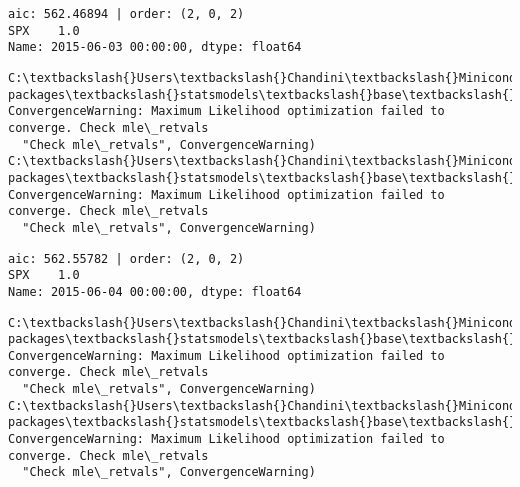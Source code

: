 \documentclass[11pt]{article}
\begin{document}
    \begin{Verbatim}[commandchars=\\\{\}]
aic: 562.46894 | order: (2, 0, 2)
SPX    1.0
Name: 2015-06-03 00:00:00, dtype: float64

    \end{Verbatim}

    \begin{Verbatim}[commandchars=\\\{\}]
C:\textbackslash{}Users\textbackslash{}Chandini\textbackslash{}Miniconda3\textbackslash{}envs\textbackslash{}auquan\textbackslash{}lib\textbackslash{}site-packages\textbackslash{}statsmodels\textbackslash{}base\textbackslash{}model.py:496: ConvergenceWarning: Maximum Likelihood optimization failed to converge. Check mle\_retvals
  "Check mle\_retvals", ConvergenceWarning)
C:\textbackslash{}Users\textbackslash{}Chandini\textbackslash{}Miniconda3\textbackslash{}envs\textbackslash{}auquan\textbackslash{}lib\textbackslash{}site-packages\textbackslash{}statsmodels\textbackslash{}base\textbackslash{}model.py:496: ConvergenceWarning: Maximum Likelihood optimization failed to converge. Check mle\_retvals
  "Check mle\_retvals", ConvergenceWarning)

    \end{Verbatim}

    \begin{Verbatim}[commandchars=\\\{\}]
aic: 562.55782 | order: (2, 0, 2)
SPX    1.0
Name: 2015-06-04 00:00:00, dtype: float64

    \end{Verbatim}

    \begin{Verbatim}[commandchars=\\\{\}]
C:\textbackslash{}Users\textbackslash{}Chandini\textbackslash{}Miniconda3\textbackslash{}envs\textbackslash{}auquan\textbackslash{}lib\textbackslash{}site-packages\textbackslash{}statsmodels\textbackslash{}base\textbackslash{}model.py:496: ConvergenceWarning: Maximum Likelihood optimization failed to converge. Check mle\_retvals
  "Check mle\_retvals", ConvergenceWarning)
C:\textbackslash{}Users\textbackslash{}Chandini\textbackslash{}Miniconda3\textbackslash{}envs\textbackslash{}auquan\textbackslash{}lib\textbackslash{}site-packages\textbackslash{}statsmodels\textbackslash{}base\textbackslash{}model.py:496: ConvergenceWarning: Maximum Likelihood optimization failed to converge. Check mle\_retvals
  "Check mle\_retvals", ConvergenceWarning)

    \end{Verbatim}
\end{document}
